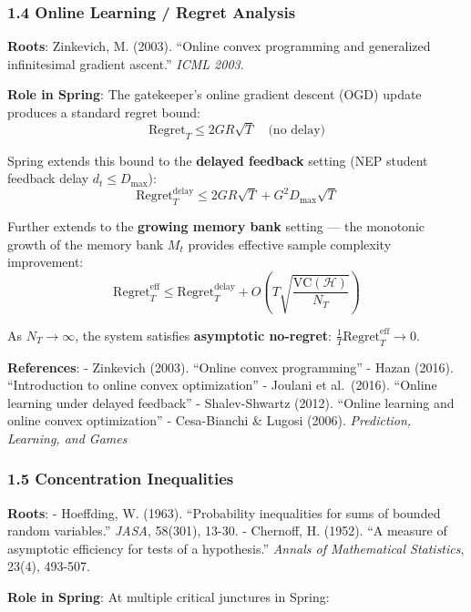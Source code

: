 \documentclass[
  12pt,
]{article}
\begin{document}
\subsubsection{1.4 Online Learning / Regret Analysis}\label{online-learning-regret}

\textbf{Roots}: Zinkevich, M. (2003). ``Online convex programming and generalized infinitesimal gradient ascent.'' \emph{ICML 2003}.

\textbf{Role in Spring}: The gatekeeper's online gradient descent (OGD) update produces a standard regret bound:
\[\text{Regret}_T \leq 2GR\sqrt{T} \quad \text{(no delay)}\]

Spring extends this bound to the \textbf{delayed feedback} setting (NEP student feedback delay $d_t \leq D_{\max}$):
\[\text{Regret}_T^{\text{delay}} \leq 2GR\sqrt{T} + G^2 D_{\max} \sqrt{T}\]

Further extends to the \textbf{growing memory bank} setting --- the monotonic growth of the memory bank $M_t$ provides effective sample complexity improvement:
\[\text{Regret}_T^{\text{eff}} \leq \text{Regret}_T^{\text{delay}} + O\left(T \sqrt{\frac{\text{VC}(\mathcal{H})}{N_T}}\right)\]

As $N_T \to \infty$, the system satisfies \textbf{asymptotic no-regret}: $\frac{1}{T}\text{Regret}_T^{\text{eff}} \to 0$.

\textbf{References}: - Zinkevich (2003). ``Online convex programming'' - Hazan (2016). ``Introduction to online convex optimization'' - Joulani et al.~(2016). ``Online learning under delayed feedback'' - Shalev-Shwartz (2012). ``Online learning and online convex optimization'' - Cesa-Bianchi \& Lugosi (2006). \emph{Prediction, Learning, and Games}

\subsubsection{1.5 Concentration Inequalities}\label{concentration-inequalities}

\textbf{Roots}: - Hoeffding, W. (1963). ``Probability inequalities for sums of bounded random variables.'' \emph{JASA}, 58(301), 13-30. - Chernoff, H. (1952). ``A measure of asymptotic efficiency for tests of a hypothesis.'' \emph{Annals of Mathematical Statistics}, 23(4), 493-507.

\textbf{Role in Spring}: At multiple critical junctures in Spring:
\end{document}
